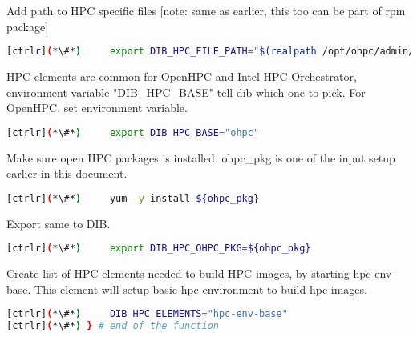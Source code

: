 	Add path to HPC specific files [note: same as earlier, this too can be part of rpm package]

\begin{lstlisting}[language=bash,keywords={}]
[ctrlr](*\#*)     export DIB_HPC_FILE_PATH="$(realpath /opt/ohpc/admin/dib-chpc/hpc-files/)"
\end{lstlisting}

	HPC elements are common for OpenHPC and Intel HPC Orchestrator, environment variable "DIB\_HPC\_BASE" tell dib which one to pick. For OpenHPC, set environment variable.

\begin{lstlisting}[language=bash,keywords={}]
[ctrlr](*\#*)     export DIB_HPC_BASE="ohpc"
\end{lstlisting}

	Make sure open HPC packages is installed. ohpc\_pkg is one of the input setup earlier in this document.

\begin{lstlisting}[language=bash,keywords={}]
[ctrlr](*\#*)     yum -y install ${ohpc_pkg}
\end{lstlisting}

	Export same to DIB.

\begin{lstlisting}[language=bash,keywords={}]
[ctrlr](*\#*)     export DIB_HPC_OHPC_PKG=${ohpc_pkg}
\end{lstlisting}

	Create list of HPC elements needed to build HPC images, by starting hpc-env-base. This element will setup basic hpc environment to build hpc images.

\begin{lstlisting}[language=bash,keywords={}]
[ctrlr](*\#*)     DIB_HPC_ELEMENTS="hpc-env-base"
[ctrlr](*\#*) } # end of the function
\end{lstlisting}
